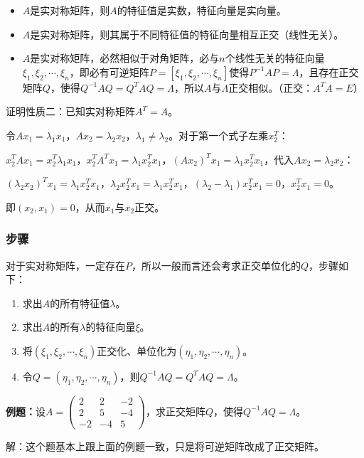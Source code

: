 \documentclass[UTF8, 12pt]{ctexart}
\begin{document}
\begin{itemize}
    \item $A$是实对称矩阵，则$A$的特征值是实数，特征向量是实向量。
    \item $A$是实对称矩阵，则其属于不同特征值的特征向量相互正交（线性无关）。
    \item $A$是实对称矩阵，必然相似于对角矩阵，必与$n$个线性无关的特征向量$\xi_1,\xi_2,\cdots,\xi_n$，即必有可逆矩阵$P=[\xi_1,\xi_2,\cdots,\xi_n]$使得$P^{-1}AP=\Lambda$，且存在正交矩阵$Q$，使得$Q^{-1}AQ=Q^TAQ=\Lambda$，所以$A$与$\Lambda$正交相似。（正交：$A^TA=E$）
\end{itemize}

证明性质二：已知实对称矩阵$A^T=A$。

令$Ax_1=\lambda_1x_1$，$Ax_2=\lambda_2x_2$，$\lambda_1\neq\lambda_2$。对于第一个式子左乘$x_2^T$：

$x_2^TAx_1=x_2^T\lambda_1x_1$，$x_2^TA^Tx_1=\lambda_1x_2^Tx_1$，$(Ax_2)^Tx_1=\lambda_1x_2^Tx_1$，代入$Ax_2=\lambda_2x_2$：

$(\lambda_2x_2)^Tx_1=\lambda_1x_2^Tx_1$，$\lambda_2x_2^Tx_1=\lambda_1x_2^Tx_1$，$(\lambda_2-\lambda_1)x_2^Tx_1=0$，$x_2^Tx_1=0$。

即$(x_2,x_1)=0$，从而$x_1$与$x_2$正交。

\subsubsection{步骤}

对于实对称矩阵，一定存在$P$，所以一般而言还会考求正交单位化的$Q$，步骤如下：

\begin{enumerate}
    \item 求出$A$的所有特征值$\lambda$。
    \item 求出$A$的所有$\lambda$的特征向量$\xi$。
    \item 将$(\xi_1,\xi_2,\cdots,\xi_n)$正交化、单位化为$(\eta_1,\eta_2,\cdots,\eta_n)$。
    \item 令$Q=(\eta_1,\eta_2,\cdots,\eta_n)$，则$Q^{-1}AQ=Q^TAQ=\Lambda$。
\end{enumerate}

\textbf{例题：}设$A=\left(\begin{array}{ccc}
    2 & 2 & -2 \\
    2 & 5 & -4 \\
    -2 & -4 & 5
\end{array}\right)$，求正交矩阵$Q$，使得$Q^{-1}AQ=\Lambda$。\medskip

解：这个题基本上跟上面的例题一致，只是将可逆矩阵改成了正交矩阵。
\end{document}
